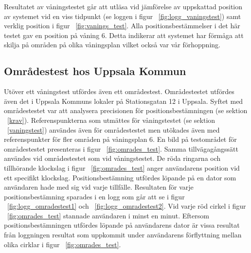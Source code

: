 \documentclass[a4paper,12pt]{article}
\begin{document}
 Resultatet av våningstestet går att utläsa vid jämförelse av uppskattad position av systemet vid en viss tidpunkt (se loggen i figur ~\ref{fig:logg_vaningstest}) samt verklig position i figur ~\ref{fig:vanings_test}. Alla positionsbestämmelser i det här testet gav en position på våning 6. Detta indikerar att systemet har förmåga att skilja på områden på olika våningsplan vilket också var vår förhoppning.

 \subsection{Områdestest hos Uppsala Kommun}
 Utöver ett våningstest utfördes även ett områdestest. Områdestestet utfördes även det i Uppsala Kommuns lokaler på Stationsgatan 12 i Uppsala. Syftet med områdestestet var att analysera precisionen för positionsbestämningen (se sektion ~\ref{krav}). Referenspunkterna som utmättes för våningstestet (se sektion ~\ref{vaningstest}) användes även för områdestestet men utökades även med referenspunkter för fler områden på våningsplan 6. En bild på testområdet för områdestestet presenteras i figur ~\ref{fig:omrades_test}. Samma tillvägagångssätt användes vid områdestestet som vid våningstestet. De röda ringarna och tillhörande klockslag i figur ~\ref{fig:omrades_test} anger användarens position vid ett specifikt klockslag. Positionsbestämning utfördes löpande på en dator som användaren hade med sig vid varje tillfälle. Resultaten för varje positionsbestämning sparades i en logg som går att se i figur ~\ref{fig:logg_omradestest1} och ~\ref{fig:logg_omradestest2}. Vid varje röd cirkel i figur ~\ref{fig:omrades_test} stannade användaren i minst en minut. Eftersom positionsbestämningen utfördes löpande på användarens dator är vissa resultat från loggningen resultat som uppkommit under användarens förflyttning mellan olika cirklar i figur ~\ref{fig:omrades_test}.
\end{document}

